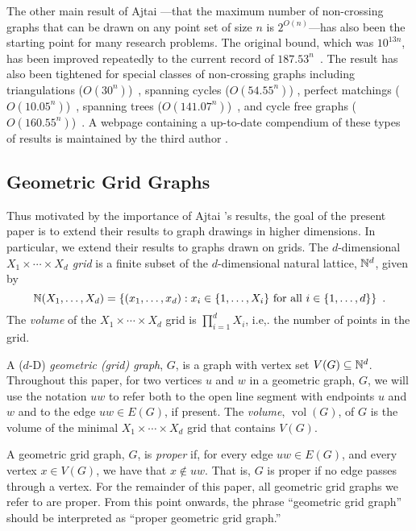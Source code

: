 \documentclass{patmorin}
\DeclareMathOperator{\volume}{vol}
\begin{document}
The other main result of Ajtai \etal---that the maximum number
of non-crossing graphs that can be drawn on any point set of
size $n$ is $2^{O(n)}$---has also been the starting point
for many research problems. The original bound, which was
$10^{13n}$, has been improved repeatedly to the current record of
$187.53^n$~\cite{sharir.sheffer:counting*1}.  The result has also
been tightened for special classes of non-crossing graphs including
triangulations ($O(30^n)$)~\cite{sharir.sheffer:counting}, spanning
cycles ($O(54.55^n)$) \cite{sharir.sheffer.ea:counting}, perfect
matchings ($O(10.05^n)$)~\cite{sharir.welzl:on}, spanning trees
($O(141.07^n)$)~\cite{hoffmann.sharir.ea:counting}, and cycle free graphs
($O(160.55^n)$)~\cite{hoffmann.sharir.ea:counting,sharir.sheffer:counting}.
A webpage containing a up-to-date compendium of these types of results
is maintained by the third author \cite{sheffer:numbers}.

\subsection{Geometric Grid Graphs}

Thus motivated by the importance of Ajtai \etal's results, the goal of
the present paper is to extend their results to graph drawings in higher
dimensions.  In particular, we extend their results to graphs drawn on
grids.  The $d$-dimensional \emph{$X_1\times\cdots\times X_d$ grid} is
a finite subset of the $d$-dimensional natural lattice, $\mathbb{N}^d$, given by
\[  \mathbb{N}(X_1,\ldots,X_d) = \{(x_1,\ldots,x_d): 
      \mbox{$x_i\in\{1,\ldots,X_i\}$ for all $i\in\{1,\ldots,d\}$}\}
	\enspace .\]
The \emph{volume} of the $X_1\times\cdots\times X_d$ grid is
$\prod_{i=1}^d X_i$, i.e,. the number of points in the grid.

A ($d$-D) \emph{geometric (grid) graph}, $G$, is a graph with vertex
set $V(G)\subseteq \mathbb{N}^d$.  Throughout this paper, for two vertices $u$
and $w$ in a geometric graph, $G$, we will use the notation $uw$ to
refer both to the open line segment with endpoints $u$ and $w$ and to
the edge $uw\in E(G)$, if present.    The \emph{volume}, $\volume(G)$,
of $G$ is the volume of the minimal $X_1\times\cdots\times X_d$ grid
that contains $V(G)$.

A geometric grid graph, $G$, is \emph{proper} if, for every edge $uw\in
E(G)$, and every vertex $x\in V(G)$, we have that $x\not\in uw$.  That is,
$G$ is proper if no edge passes through a vertex.  For the remainder of
this paper, all geometric grid graphs we refer to are proper.  From this
point onwards, the phrase ``geometric grid graph'' should be interpreted
as ``proper geometric grid graph.''
\end{document}
